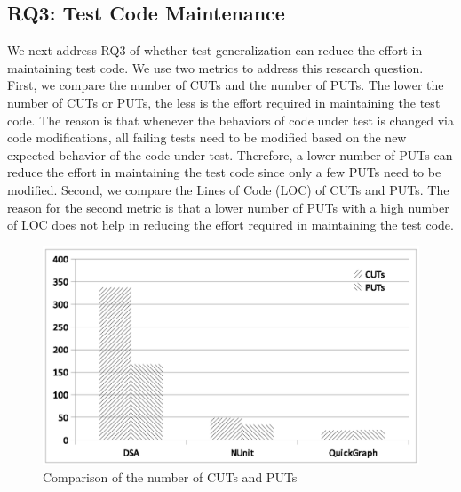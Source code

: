 \subsection{RQ3: Test Code Maintenance}

We next address RQ3 of whether test generalization can reduce the effort in maintaining test code. We use two metrics to address this research question. First, we compare the number of CUTs and the number of PUTs. The lower the number of CUTs or PUTs, the less is the effort required in maintaining the test code. The reason is that whenever the behaviors of code under test is changed via code modifications, all failing tests need to be modified based on the new expected behavior of the code under test. Therefore, a lower number of PUTs can reduce the effort in maintaining the test code since only a few PUTs need to be modified. Second, we compare the Lines of Code (LOC) of CUTs and PUTs. The reason for the second metric is that a lower number of PUTs with a high number of LOC does not help in reducing the effort required in maintaining the test code.

\begin{figure}[t]
\centering
\includegraphics[scale=0.60,clip,trim=200 200 00 150]{charts/CUTs_PUTs_1.eps}\vspace*{-4ex}
\caption{\label{fig:cutsnputs}Comparison of the number of CUTs and PUTs} \vspace*{-4ex}
\end{figure}

